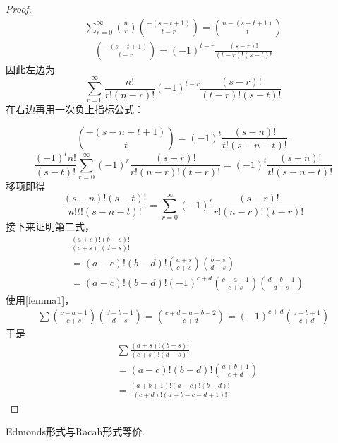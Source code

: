 \begin{proof}
    \begin{align*}
        \sum_{r=0}^\infty \binom{n}{r}\binom{-(s-t+1)}{t-r}=\binom{n-(s-t+1)}{t}
    \end{align*}
    \begin{align*}
        \binom{-(s-t+1)}{t-r}=(-1)^{t-r}\frac{(s-r)!}{(t-r)!(s-t)!}
    \end{align*}
    因此左边为
\[
\sum_{r=0}^\infty\frac{n!}{r!(n-r)!}(-1)^{t-r}\frac{(s-r)!}{(t-r)!(s-t)!}
\]
在右边再用一次负上指标公式：

\[\binom{-(s-n-t+1)}{t}=(-1)^t\frac{(s-n)!}{t!(s-n-t)!}.
\]
\[ \frac{(-1)^t n!}{(s-t)!} \sum_{r=0}^\infty (-1)^r \frac{(s-r)!}{r!(n-r)!(t-r)!}=(-1)^t\frac{(s-n)!}{t!(s-n-t)!}
\]
移项即得
\[
\frac{(s-n)!(s-t)!}{n!t!(s-n-t)!}=\sum_{r=0}^\infty(-1)^r\frac{(s-r)!}{r!(n-r)!(t-r)!}
\]
接下来证明第二式，
\begin{align*}
    &\frac{(a+s)!(b-s)!}{(c+s)!(d-s)!}\\
    &=(a-c)!(b-d)!\binom{a+s}{c+s}\binom{b-s}{d-s}\\
    &=(a-c)!(b-d)!(-1)^{c+d}\binom{c-a-1}{c+s}\binom{d-b-1}{d-s}
\end{align*}
使用\ref{lemma1}，
\begin{align*}
    \sum\binom{c-a-1}{c+s}\binom{d-b-1}{d-s} = \binom{c+d-a-b-2}{c+d} = (-1)^{c+d}\binom{a+b+1}{c+d}
\end{align*}
于是
\begin{align*}
    &\sum\frac{(a+s)!(b-s)!}{(c+s)!(d-s)!} \\
    &= (a-c)!(b-d)!\binom{a+b+1}{c+d}\\
    &= \frac{(a+b+1)!(a-c)!(b-d)!}{(c+d)!(a+b-c-d+1)!}
\end{align*}
\end{proof}
\begin{theorem}
    Edmonds形式与Racah形式等价.
\end{theorem}
